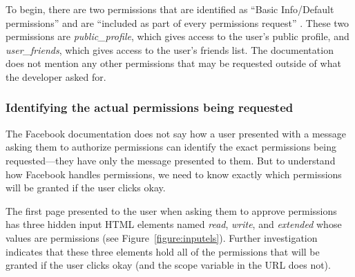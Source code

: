 \documentclass[10pt]{sig-alternate-10pt}
\begin{document}
To begin, there are two permissions that are identified as ``Basic Info/Default permissions'' and are ``included as part of every permissions request'' \cite{fbpermsinstructions}. These two permissions are \emph{public\_profile}, which gives access to the user's public profile, and \emph{user\_friends}, which gives access to the user's friends list. The documentation does not mention any other permissions that may be requested outside of what the developer asked for.

\subsubsection{Identifying the actual permissions being requested}
\label{sec:inputels}

The Facebook documentation does not say how a user presented with a message asking them to authorize permissions can identify the exact permissions being requested---they have only the message presented to them. But to understand how Facebook handles permissions, we need to know exactly which permissions will be granted if the user clicks okay. 

The first page presented to the user when asking them to approve permissions has three hidden input HTML elements named \emph{read}, \emph{write}, and \emph{extended} whose values are permissions (see Figure~\ref{figure:inputels}). Further investigation indicates that these three elements hold all of the permissions that will be granted if the user clicks okay (and the scope variable in the URL does not).
\end{document}
